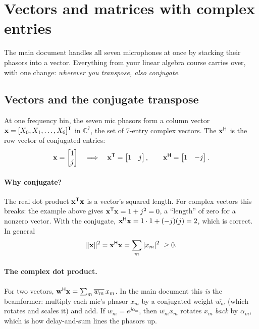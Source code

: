 \documentclass[11pt]{article}
\begin{document}
\section{Vectors and matrices with complex entries}\label{sec:linalg}

The main document handles all seven microphones at once by stacking their phasors into a vector.
Everything from your linear algebra course carries over, with one change: \emph{wherever you
transpose, also conjugate.}

\subsection{Vectors and the conjugate transpose}

At one frequency bin, the seven mic phasors form a column vector
$\mathbf x=[X_0,X_1,\dots,X_6]^{\mathsf T}$ in $\mathbb C^7$, the set of 7-entry complex vectors. The
 $\mathbf x^{\mathsf H}$ is the row vector of conjugated entries:
\[
  \mathbf x=\begin{bmatrix}1\\ j\end{bmatrix}
  \quad\Longrightarrow\quad
  \mathbf x^{\mathsf T}=\begin{bmatrix}1 & j\end{bmatrix},\qquad
  \mathbf x^{\mathsf H}=\begin{bmatrix}1 & -j\end{bmatrix}.
\]

\paragraph{Why conjugate?} The real dot product $\mathbf x^{\mathsf T}\mathbf x$ is a vector's squared length.
For complex vectors this breaks: the example above gives $\mathbf x^{\mathsf T}\mathbf x=1+j^2=0$, a
``length'' of zero for a nonzero vector. With the conjugate,
$\mathbf x^{\mathsf H}\mathbf x=1\cdot1+(-j)(j)=2$, which is correct. In general
\begin{equation}\label{eq:norm}
  \|\mathbf x\|^2=\mathbf x^{\mathsf H}\mathbf x=\sum_m|x_m|^2\ \ge 0.
\end{equation}

\paragraph{The complex dot product.} For two vectors,
$\mathbf w^{\mathsf H}\mathbf x=\sum_m\overline{w_m}\,x_m$. In the main document this \emph{is} the
beamformer: multiply each mic's phasor $x_m$ by a conjugated weight $\overline{w_m}$ (which
rotates and scales it) and add. If $w_m=e^{j\alpha_m}$, then $\overline{w_m}x_m$ rotates $x_m$
\emph{back} by $\alpha_m$, which is how delay-and-sum lines the phasors up.
\end{document}
